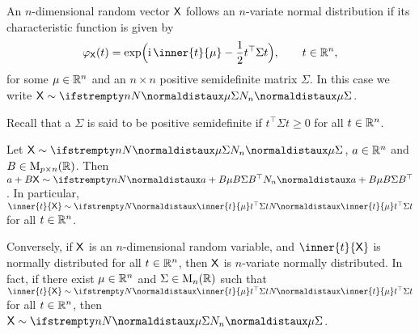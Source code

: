 \documentclass[article, a4paper, 11pt, oneside]{memoir}
\title{\doctitle}
\author{\docauthor}
\numberwithin{equation}{chapter}
\newcommand{\mat}{\mathrm{M}}
\newcommand{\trans}{\top}
\begin{document}
\maketitle




\begin{definition}
    An $n$-dimensional random vector $\mathsf{X}$ follows an $n$-variate normal distribution if its characteristic function is given by
    \begin{equation*}
        \phi_{\rvar X}(t)
            = \exp \Bigl( \iu \inner{t}{\mu} - \frac{1}{2} t^\trans \Sigma t \Bigr),
            \qquad t \in \reals^n,
    \end{equation*}
    for some $\mu \in \mathbb{R}^n$ and an $n \times n$ positive semidefinite matrix $\Sigma$. In this case we write $\rvar{X} \dist \normaldist[n]{\mu}{\Sigma}$.
\end{definition}
%
Recall that a $\Sigma$ is said to be positive semidefinite if $t^\trans \Sigma t \geq 0$ for all $t \in \mathbb{R}^n$.




\begin{proposition}
    Let
        $\rvar X \dist \normaldist[n]{\mu}{\Sigma}$,
        $a \in \mathbb{R}^n$ and
        $B \in \mat_{p \times n}(\reals)$.
    Then
        $a + B \rvar X \dist \normaldist[n]{a + B\mu}{B \Sigma B^\trans}$.
    In particular,
        $\inner{t}{\rvar X} \dist \normaldist{
            \inner{t}{\mu}
        }{
            t^\trans \Sigma t
        }$
    for all $t \in \mathbb{R}^n$.

    Conversely, if $\mathsf{X}$ is an $n$-dimensional random variable, and $\inner{t}{\rvar X}$ is normally distributed for all $t \in \mathbb{R}^n$, then $\mathsf{X}$ is $n$-variate normally distributed. In fact, if there exist $\mu \in \mathbb{R}^n$ and $\Sigma \in \mat_n(\reals)$ such that
        $\inner{t}{\rvar X} \dist \normaldist{
            \inner{t}{\mu}
        }{
            t^\trans \Sigma t
        }$
    for all $t \in \mathbb{R}^n$, then $\rvar X \dist \normaldist[n]{\mu}{\Sigma}$.
\end{proposition}
\end{document}
